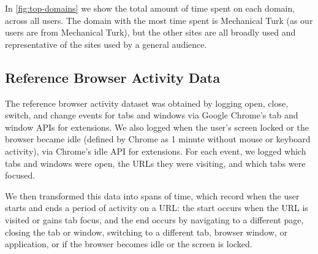 \documentclass{sigchi}
\begin{document}


In \autoref{fig:top-domains} we show the total amount of time spent on each domain, across all users. The domain with the most time spent is Mechanical Turk (as our users are from Mechanical Turk), but the other sites are all broadly used and representative of the sites used by a general audience.


\subsection{Reference Browser Activity Data}

The reference browser activity dataset was obtained by logging open, close, switch, and change events for tabs and windows via Google Chrome's tab and window APIs for extensions. We also logged when the user's screen locked or the browser became idle (defined by Chrome as 1 minute without mouse or keyboard activity), via Chrome's idle API for extensions. For each event, we logged which tabs and windows were open, the URLs they were visiting, and which tabs were focused.

We then transformed this data into spans of time, which record when the user starts and ends a period of activity on a URL: the start occurs when the URL is visited or gains tab focus, and the end occurs by navigating to a different page, closing the tab or window, switching to a different tab, browser window, or application, or if the browser becomes idle or the screen is locked.

\end{document}
